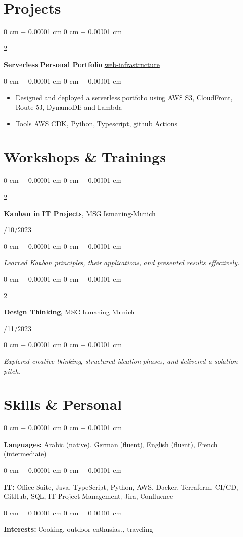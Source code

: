 \documentclass[10pt, letterpaper]{article}
\newenvironment{highlights}{
    \begin{itemize}[
        topsep=0.10 cm,
        parsep=0.10 cm,
        partopsep=0pt,
        itemsep=0pt,
        leftmargin=0 cm + 10pt
    ]
}{
    \end{itemize}
} %
\newenvironment{onecolentry}{
    \begin{adjustwidth}{
        0 cm + 0.00001 cm
    }{
        0 cm + 0.00001 cm
    }
}{
    \end{adjustwidth}
} %
\newenvironment{twocolentry}[2][]{
    \onecolentry
    \def\secondColumn{#2}
    \setcolumnwidth{\fill, 4.5 cm}
    \begin{paracol}{2}
}{
    \switchcolumn \raggedleft \secondColumn
    \end{paracol}
    \endonecolentry
} %
\begin{document}
    \section{Projects}        
        \begin{twocolentry}{
           \href{https://github.com/aalhousseini/web-infrastructure}{web-infrastructure}
        }
            \textbf{Serverless Personal Portfolio}\end{twocolentry}
        \vspace{0.10 cm}
        \begin{onecolentry}
            \begin{highlights}
                \item Designed and deployed a serverless portfolio using AWS S3, CloudFront, Route 53, DynamoDB and Lambda
                \item Tools AWS CDK, Python, Typescript, github Actions
            \end{highlights}
        \end{onecolentry}

\vspace{0.2 cm}
        \vspace{0.2 cm}

     
    \section{Workshops \& Trainings}
\begin{twocolentry}{11/10/2023}
\textbf{Kanban in IT Projects}, MSG Ismaning-Munich
\end{twocolentry}
\begin{onecolentry}
\textit{Learned Kanban principles, their applications, and presented results effectively.}
\end{onecolentry}

\vspace{0.2cm}
\begin{twocolentry}{03/11/2023}
\textbf{Design Thinking}, MSG Ismaning-Munich
\end{twocolentry}
\begin{onecolentry}
\textit{Explored creative thinking, structured ideation phases, and delivered a solution pitch.}
\end{onecolentry}    
 \section{Skills \& Personal}

\begin{onecolentry}
\textbf{Languages:} Arabic (native), German (fluent), English (fluent), French (intermediate)
\end{onecolentry}
\vspace{0.1cm}
\begin{onecolentry}
\textbf{IT:} Office Suite, Java, TypeScript, Python, AWS, Docker, Terraform, CI/CD, GitHub, SQL, IT Project Management, Jira, Confluence
\end{onecolentry}
\vspace{0.1cm}
\begin{onecolentry}
\textbf{Interests:} Cooking, outdoor enthusiast, traveling
\end{onecolentry}


    
\end{document}
